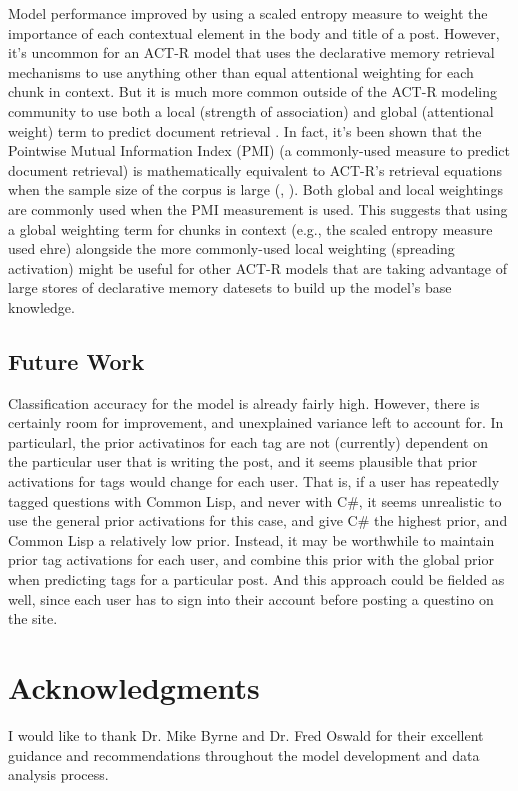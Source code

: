\documentclass[10pt,letterpaper]{article}
\begin{document}
Model performance improved by using a scaled entropy measure to weight the importance of each contextual element in the body and title of a post.
However, it's uncommon for an ACT-R model that uses the declarative memory retrieval mechanisms to use anything other than equal attentional weighting for each chunk in context.
But it is much more common outside of the ACT-R modeling community to use both a local (strength of association) and global (attentional weight) term to predict document retrieval .
In fact, it's been shown that the Pointwise Mutual Information Index (PMI) (a commonly-used measure to predict document retrieval) is mathematically equivalent to ACT-R's retrieval equations when the sample size of the corpus is large (, ).
Both global and local weightings are commonly used when the PMI measurement is used.
This suggests that using a global weighting term for chunks in context (e.g., the scaled entropy measure used ehre) alongside the more commonly-used local weighting (spreading activation) might be useful for other ACT-R models that are taking advantage of large stores of declarative memory datesets to build up the model's base knowledge.

\subsection{Future Work}

Classification accuracy for the model is already fairly high.
However, there is certainly room for improvement, and unexplained variance left to account for.
In particularl, the prior activatinos for each tag are not (currently) dependent on the particular user that is writing the post, and it seems plausible that prior activations for tags would change for each user.
That is, if a user has repeatedly tagged questions with Common Lisp, and never with C\#, it seems unrealistic to use the general prior activations for this case, and give C\# the highest prior, and Common Lisp a relatively low prior.
Instead, it may be worthwhile to maintain prior tag activations for each user, and combine this prior with the global prior when predicting tags for a particular post.
And this approach could be fielded as well, since each user has to sign into their account before posting a questino on the site.

\section{Acknowledgments}

I would like to thank Dr. Mike Byrne and Dr. Fred Oswald for their excellent guidance and recommendations throughout the model development and data analysis process.


\setlength{\bibleftmargin}{.125in}
\setlength{\bibindent}{-\bibleftmargin}

\end{document}
